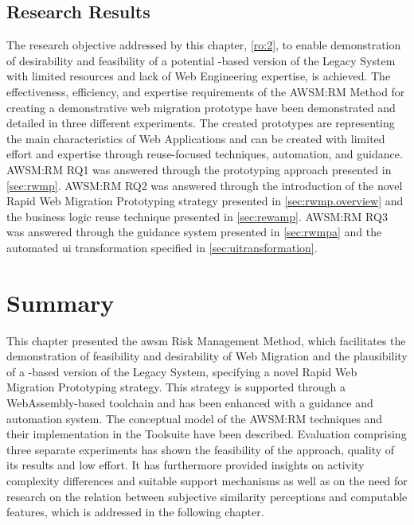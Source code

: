 \vspace{-10pt}
\hypertarget{sec:rm.evaluation.objective}{%
\subsection{Research Results}\label{sec:rm.evaluation.objective}}
\vspace{10pt}

The research objective addressed by this chapter, \cref{ro:2}, to enable demonstration of desirability and feasibility of a potential -based version of the \gls{Legacy System} with limited resources and lack of \gls{Web Engineering} expertise, is achieved.
The effectiveness, efficiency, and expertise requirements of the AWSM:RM Method for creating a demonstrative \gls{web migration prototype} have been demonstrated and detailed in three different experiments.
The created prototypes are representing the main characteristics of \glspl{Web Application} and can be created with limited effort and expertise through reuse-focused techniques, automation, and guidance.
AWSM:RM RQ1 was answered through the prototyping approach presented in \cref{sec:rwmp}.
AWSM:RM RQ2 was answered through the introduction of the novel \gls{Rapid Web Migration Prototyping} strategy presented in \cref{sec:rwmp.overview} and the business logic reuse technique presented in \cref{sec:rewamp}.
AWSM:RM RQ3 was answered through the guidance system presented in \cref{sec:rwmpa} and the automated \gls{ui} transformation specified in \cref{sec:uitransformation}.

\vspace{-15pt}
\hypertarget{sec:rm.summary}{%
\section{Summary}\label{sec:rm.summary}}
\vspace{10pt}

This chapter presented the \gls{awsm} Risk Management Method, which facilitates the demonstration of feasibility and desirability of \gls{Web Migration} and the plausibility of a -based version of the \gls{Legacy System}, specifying a novel \gls{Rapid Web Migration Prototyping} strategy.
This strategy is supported through a WebAssembly-based toolchain and has been enhanced with a guidance and automation system.
The conceptual model of the AWSM:RM techniques and their implementation in the Toolsuite have been described.
Evaluation comprising three separate experiments has shown the feasibility of the approach, quality of its results and low effort.
It has furthermore provided insights on activity complexity differences and suitable support mechanisms as well as on the need for research on the relation between subjective similarity perceptions and computable features, which is addressed in the following chapter.
